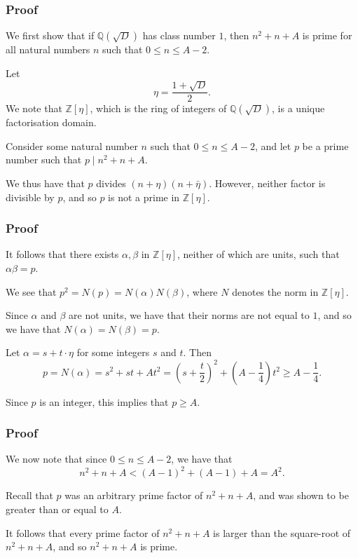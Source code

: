\documentclass{beamer}
\begin{document}
\begin{frame}

	\frametitle{Proof}

	We first show that if $\mathbb{Q}(\sqrt{D})$ has class number $1$, then $n^2 + n + A$ is prime for all natural numbers $n$ such that $0 \leq n \leq A - 2$. \pause

	Let
	\[
		\eta = \frac{1 + \sqrt{D}}{2}.
	\]
	We note that $\mathbb{Z}[\eta]$, which is the ring of integers of $\mathbb{Q}(\sqrt{D})$, is a unique factorisation domain. \pause

	Consider some natural number $n$ such that $0 \leq n \leq A - 2$, and let $p$ be a prime number such that $p \mid n^2 + n + A$. \pause

	We thus have that $p$ divides $(n + \eta)(n + \bar{\eta})$. However, neither factor is divisible by $p$, and so $p$ is not a prime in $\mathbb{Z}[\eta]$.

\end{frame}

\begin{frame}

	\frametitle{Proof}

	It follows that there exists $\alpha, \beta$ in $\mathbb{Z}[\eta]$, neither of which are units, such that $\alpha \beta = p$. \pause

	We see that $p^2 = N(p) = N(\alpha) N(\beta)$, where $N$ denotes the norm in $\mathbb{Z}[\eta]$. \pause

	Since $\alpha$ and $\beta$ are not units, we have that their norms are not equal to $1$, and so we have that $N(\alpha) = N(\beta) = p$. \pause

	Let $\alpha = s + t \cdot \eta$ for some integers $s$ and $t$. Then 
	\[
		p = N(\alpha) = s^2 + st + At^2 = {\left( s + \frac{t}{2} \right)}^2 + \left(A - \frac{1}{4} \right) t^2 \geq A - \frac{1}{4}.
	\] \pause

	Since $p$ is an integer, this implies that $p \geq A$.

\end{frame}

\begin{frame}

	\frametitle{Proof}

	We now note that since $0 \leq n \leq A - 2$, we have that
	\[
		n^2 + n + A < {(A - 1)}^2 + (A - 1) + A = A^2.
	\] \pause

	Recall that $p$ was an arbitrary prime factor of $n^2 + n + A$, and was shown to be greater than or equal to $A$. \pause

	It follows that every prime factor of $n^2 + n + A$ is larger than the square-root of $n^2 + n + A$, and so $n^2 + n + A$ is prime.

\end{frame}
\end{document}
